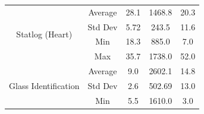 \documentclass[conference,compsoc]{IEEEtran}
\begin{document}
\begin{table}[]
\begin{tabular}{|c|c|c|c|c|}
		\multirow{4}{*}{Statlog (Heart)}       & Average                                  & 28.1                                                                                          & 1468.8                                                                                                          & 20.3                                                                                                \\ \cline{2-5} 
		& Std Dev                                  & 5.72                                                                                          & 243.5                                                                                                           & 11.6                                                                                                \\ \cline{2-5} 
		& Min                                      & 18.3                                                                                          & 885.0                                                                                                           & 7.0                                                                                                 \\ \cline{2-5} 
		& Max                                      & 35.7                                                                                          & 1738.0                                                                                                          & 52.0                                                                                                \\ \hline
		\multirow{4}{*}{Glass Identification}  & Average                                  & 9.0                                                                                          & 2602.1                                                                                                          & 14.8                                                                                                \\ \cline{2-5} 
		& Std Dev                                  & 2.6                                                                                           & 502.69                                                                                                          & 13.0                                                                                                \\ \cline{2-5} 
		& Min                                      & 5.5                                                                                          & 1610.0                                                                                                          & 3.0                                                                                                 \\ \cline{2-5} 

\end{tabular}
\end{table}
\end{document}
